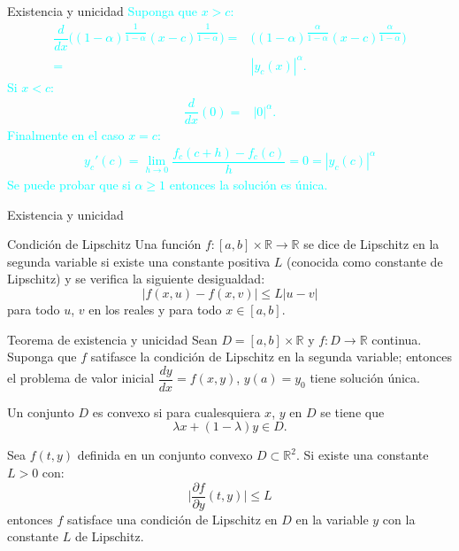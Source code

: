 \begin{frame}{Existencia y unicidad}
\textcolor{cyan}{
Suponga que $x>c$:
\begin{align*}
\dfrac{d}{dx}\bigg((1-\alpha)^{\dfrac{1}{1-\alpha}}(x-c)^{\dfrac{1}{1-\alpha}}\bigg)=&\bigg((1-\alpha)^{\dfrac{\alpha}{1-\alpha}}(x-c)^{\dfrac{\alpha}{1-\alpha}}\bigg)\\
=&|y_c(x)|^{\alpha}.
\end{align*}
Si $x<c$:
\begin{align*}
\dfrac{d}{dx}(0)=&|0|^\alpha.
\end{align*}
Finalmente en el caso $x=c$:
\begin{align*}
y_c'(c)=\lim_{h\rightarrow 0}\dfrac{f_c(c+h)-f_c(c)}{h}=0=|y_c(c)|^\alpha
\end{align*}\pause
Se puede probar que si $\alpha\geq 1$ entonces la solución es única. 
}
\end{frame}
\begin{frame}{Existencia y unicidad}
\begin{block}{Condición de Lipschitz}
Una función $f:[a,b]\times \mathbb{R}\rightarrow \mathbb{R}$ se dice de Lipschitz en la segunda variable si existe una constante positiva $L$ (conocida como constante de Lipschitz) y se verifica la siguiente desigualdad:
$$|f(x,u)-f(x,v)|\leq L|u-v|$$
para todo $u$, $v$ en los reales y para todo $x\in [a,b]$. 
\end{block}
\begin{block}{Teorema de existencia y unicidad}
Sean $D=[a,b]\times \mathbb{R}$ y $f:D\rightarrow \mathbb{R}$ continua. Suponga que $f$ satifasce la condición de Lipschitz en la segunda variable; entonces el problema de valor inicial $\dfrac{dy}{dx}=f(x,y)$, $y(a)=y_0$ tiene solución única.
\end{block}
\end{frame}
\begin{frame}
\begin{Def}
Un conjunto $D$ es convexo si para cualesquiera $x$, $y$ en $D$ se tiene que $$\lambda x+(1-\lambda )y\in D.$$
\end{Def}
\begin{Teo}[Criterio]
Sea $f(t,y)$ definida en un conjunto convexo $D\subset \mathbb{R}^2.$ Si existe una constante $L>0$ con:
$$\bigg|\dfrac{\partial f}{\partial y}(t,y)\bigg|\leq L$$
entonces $f$ satisface una condición de Lipschitz en $D$ en la variable $y$ con la constante $L$ de Lipschitz.
\end{Teo}
\end{frame}
